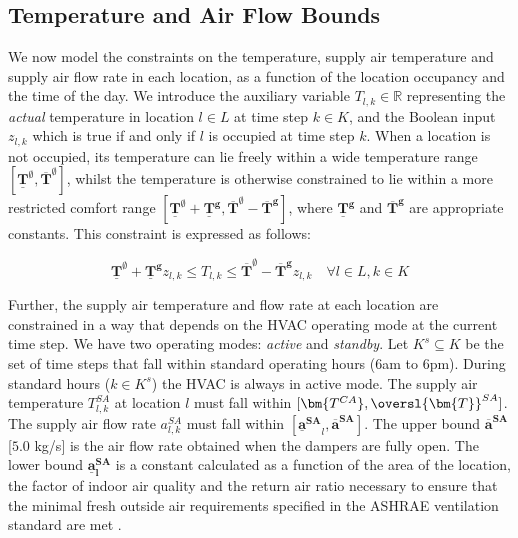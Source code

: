 \subsection{Temperature and Air Flow Bounds}
We now model the constraints on the temperature, supply air temperature and supply air flow rate in each location, as a function
of the location occupancy and the time of the day.  We introduce the auxiliary variable $T_{l,k} \in \mathbb{R}$ representing the {\em
  actual} temperature in location $l\in L$ at time step $k\in K$, and the Boolean input $z_{l,k}$ which is true if and only if $l$ is occupied at time step $k$. When a location is not occupied, its temperature can lie freely within a wide temperature range $[\bm{\underline{T}^{\emptyset}}, \bm{\overline{T}^{\emptyset}}]$, whilst the temperature is otherwise constrained to lie within a more restricted comfort range $[\bm{\underline{T}^{\emptyset}} + \bm{\underline{T}^g}, \bm{\overline{T}^{\emptyset}}-\bm{\overline{T}^g}]$, where $\bm{\underline{T}^g}$ and $\bm{\overline{T}^g}$ are appropriate constants. This constraint is expressed as follows:

\begin{equation} \label{eq:temp_cstr}
\bm{\underline{T}^{\emptyset}} + \bm{\underline{T}^g} z_{l,k} \leq T_{l,k} \leq \bm{\overline{T}^{\emptyset}} - \bm{\overline{T}^g} z_{l,k} \quad \forall l\in L , k \in K 
\end{equation}

Further, the supply air temperature and flow rate at each location are constrained in a way that depends on the HVAC operating mode at the
current time step. We have two operating modes: {\em active} and {\em standby}. Let $K^{s} \subseteq K$ be the set of time steps that fall
within standard operating hours (6am to 6pm).  During standard hours ($k\in K^s$) the HVAC is always in active mode. The supply air
temperature $T^{SA}_{l,k}$ at location $l$ must fall within $[\bm{T^{CA}}, \oversl{\bm{T}}^{SA}]$. The supply air flow rate $a_{l,k}^{SA}$ must fall within $[\bm{\underline{a}^{SA}}_{l}, \bm{\overline{a}^{SA}}]$. The upper bound $\bm{\overline{a}^{SA}}$ [$5.0$ kg/s] is the air flow rate obtained when the dampers are fully open. The lower bound $\bm{\underline{a}^{SA}_l}$ is a constant calculated as a function of the area of the location, the factor of indoor air quality and the return air ratio necessary to ensure that the minimal fresh outside air requirements specified in the ASHRAE ventilation standard are met \citep{ashrae2013thermal}. 

